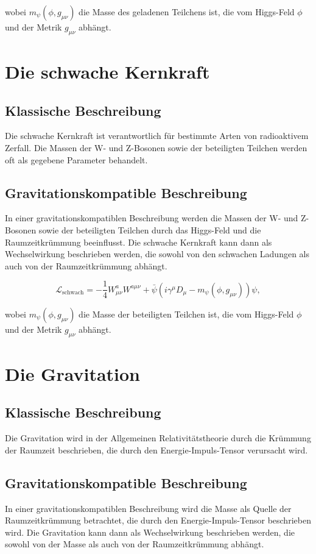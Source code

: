 \documentclass{article}
\begin{document}
	wobei $m_\psi(\phi, g_{\mu\nu})$ die Masse des geladenen Teilchens ist, die vom Higgs-Feld $\phi$ und der Metrik $g_{\mu\nu}$ abhängt.
	
	\section{Die schwache Kernkraft}
	
	\subsection{Klassische Beschreibung}
	Die schwache Kernkraft ist verantwortlich für bestimmte Arten von radioaktivem Zerfall. Die Massen der W- und Z-Bosonen sowie der beteiligten Teilchen werden oft als gegebene Parameter behandelt.
	
	\subsection{Gravitationskompatible Beschreibung}
	In einer gravitationskompatiblen Beschreibung werden die Massen der W- und Z-Bosonen sowie der beteiligten Teilchen durch das Higgs-Feld und die Raumzeitkrümmung beeinflusst. Die schwache Kernkraft kann dann als Wechselwirkung beschrieben werden, die sowohl von den schwachen Ladungen als auch von der Raumzeitkrümmung abhängt.
	
	\begin{equation}
		\mathcal{L}_\text{schwach} = -\frac{1}{4} W_{\mu\nu}^a W^{a\mu\nu} + \bar{\psi}(i \gamma^\mu D_\mu - m_\psi(\phi, g_{\mu\nu}))\psi,
	\end{equation}
	
	wobei $m_\psi(\phi, g_{\mu\nu})$ die Masse der beteiligten Teilchen ist, die vom Higgs-Feld $\phi$ und der Metrik $g_{\mu\nu}$ abhängt.
	
	\section{Die Gravitation}
	
	\subsection{Klassische Beschreibung}
	Die Gravitation wird in der Allgemeinen Relativitätstheorie durch die Krümmung der Raumzeit beschrieben, die durch den Energie-Impuls-Tensor verursacht wird.
	
	\subsection{Gravitationskompatible Beschreibung}
	In einer gravitationskompatiblen Beschreibung wird die Masse als Quelle der Raumzeitkrümmung betrachtet, die durch den Energie-Impuls-Tensor beschrieben wird. Die Gravitation kann dann als Wechselwirkung beschrieben werden, die sowohl von der Masse als auch von der Raumzeitkrümmung abhängt.
	
\end{document}
